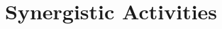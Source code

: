 \documentclass[12pt]{article}
\def\HCode#1{}
\renewenvironment{itemize}{
  \begin{list}{}{
    \setlength{\itemsep}{0.25em}
    \setlength{\parskip}{0pt}
    \setlength{\parsep}{0.25em}
  }
}{
  \end{list}
}
\begin{document}
%
%
%



\HCode{<a name="journalpapers"></a>}
%
%
%


%
%
%
%
%
%

\section*{Synergistic Activities}
\end{document}
